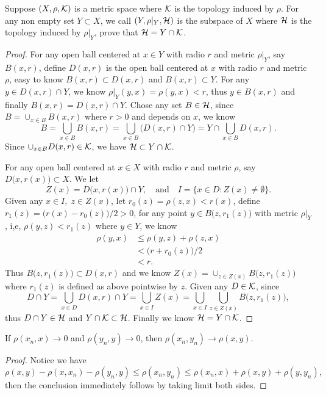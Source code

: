\begin{pro}%
	Suppose $(X,\rho,\mathcal{K})$ is a metric space where $\mathcal{K}$ is the topology induced by $\rho$. For any non empty set $Y\subset X$, we call $(Y,\rho|_Y,\mathcal{H})$ is the subspace of $X$ where $\mathcal{H}$ is the topology induced by $\rho|_Y$, prove that $\mathcal{H}=Y\cap\mathcal{K}$. 
\end{pro}
\begin{proof}
	For any open ball centered at $x\in Y$ with radio $r$ and metric $\rho|_Y$, say $B(x,r)$, define $D(x,r)$ is the open ball centered at $x$ with radio $r$ and metric $\rho$, easy to know $B(x,r)\subset D(x,r)$ and $B(x,r)\subset Y$. For any $y\in D(x,r)\cap Y$, we know $\rho|_Y(y,x)=\rho(y,x)<r$, thus $y\in B(x,r)$ and finally $B(x,r)=D(x,r)\cap Y$. Chose any set $B\in\mathcal{H}$, since $B=\cup_{x\in B} B(x,r)$ where $r>0$ and depends on $x$, we know
	\[B=\bigcup_{x\in B} B(x,r)=\bigcup_{x\in B}\big(D(x,r)\cap Y\big)=Y\cap \bigcup_{x\in B} D(x,r).\]
	Since $\cup_{x\in B} D(x,r)\in\mathcal{K}$, we have $\mathcal{H}\subset Y\cap\mathcal{K}$. 

	For any open ball centered at $x\in X$ with radio $r$ and metric $\rho$, say $D\big(x,r(x)\big)\subset X$. We let  
	\[Z(x)=D\big(x,r(x)\big)\cap Y,\quad\mbox{and}\quad I=\{x\in D\colon Z(x)\neq\emptyset\}.\]
	Given any $x\in I,\;z\in Z(x)$, let $r_0(z)=\rho(z,x)<r(x)$, define $r_1(z)=\big(r(x)-r_0(z)\big)/2>0$, for any point $y\in B\big(z,r_1(z)\big)$ with metric $\rho|_Y$, i,e, $\rho(y,z)<r_1(z)$ where $y\in Y$, we know 
	\begin{align*}
		\rho(y,x)&\leq \rho(y,z)+\rho(z,x)\\
				 &< \big(r+r_0(z)\big)/2\\
				 &<r.
	\end{align*}
	Thus $B\big(z,r_1(z)\big)\subset D(x,r)$ and we know $Z(x)=\cup_{z\in Z(x)} B\big(z,r_1(z)\big)$ where $r_1(z)$ is defined as above pointwise by $z$. Given any $D\in\mathcal{K}$, since
	\[D\cap Y=\bigcup_{x\in D} D(x,r)\cap Y=\bigcup_{x\in I} Z(x)=\bigcup_{x\in I} \bigcup_{z\in Z(x)} B\big(z,r_1(z)\big),\]
	thus $D\cap Y\in \mathcal{H}$ and $Y\cap \mathcal{K}\subset\mathcal{H}$. Finally we know $\mathcal{H}=Y\cap\mathcal{K}$.
\end{proof}

\begin{pro}%
	If $\rho(x_n,x)\to 0$ and $\rho(y_n,y)\to 0$, then $\rho(x_n,y_n)\to\rho(x,y)$.
\end{pro}
\begin{proof}
	Notice we have
	\[\rho(x,y)-\rho(x,x_n)-\rho(y_n,y)\leq \rho(x_n,y_n)\leq \rho(x_n,x)+\rho(x,y)+\rho(y,y_n),\]
	then the conclusion immediately follows by taking limit both sides.
\end{proof}


